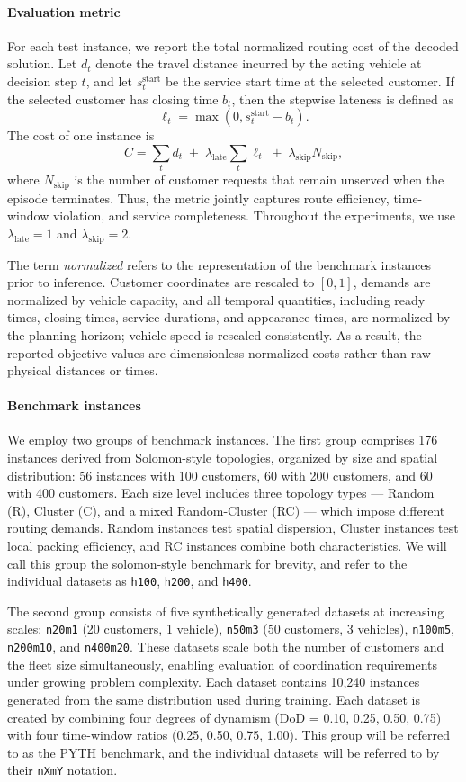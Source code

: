 \documentclass[conference]{IEEEtran}
\begin{document}
\paragraph{Evaluation metric}
For each test instance, we report the total normalized routing cost of the decoded solution. Let $d_t$ denote the travel distance incurred by the acting vehicle at decision step $t$, and let $s_t^{\mathrm{start}}$ be the service start time at the selected customer. If the selected customer has closing time $b_t$, then the stepwise lateness is defined as
\[
\ell_t = \max(0, s_t^{\mathrm{start}} - b_t).
\]
The cost of one instance is
\[
C
=
\sum_t d_t
\;+\;
\lambda_{\mathrm{late}} \sum_t \ell_t
\;+\;
\lambda_{\mathrm{skip}} N_{\mathrm{skip}},
\]
where $N_{\mathrm{skip}}$ is the number of customer requests that remain unserved when the episode terminates. Thus, the metric jointly captures route efficiency, time-window violation, and service completeness. Throughout the experiments, we use $\lambda_{\mathrm{late}} = 1$ and $\lambda_{\mathrm{skip}} = 2$.

The term \emph{normalized} refers to the representation of the benchmark instances prior to inference. Customer coordinates are rescaled to $[0,1]$, demands are normalized by vehicle capacity, and all temporal quantities, including ready times, closing times, service durations, and appearance times, are normalized by the planning horizon; vehicle speed is rescaled consistently. As a result, the reported objective values are dimensionless normalized costs rather than raw physical distances or times.

\paragraph{Benchmark instances}
We employ two groups of benchmark instances. The first group comprises 176 instances derived from Solomon-style topologies, organized by size and spatial distribution: 56 instances with 100 customers, 60 with 200 customers, and 60 with 400 customers. Each size level includes three topology types --- Random (R), Cluster (C), and a mixed Random-Cluster (RC) --- which impose different routing demands. Random instances test spatial dispersion, Cluster instances test local packing efficiency, and RC instances combine both characteristics. We will call this group the solomon-style benchmark for brevity, and refer to the individual datasets as \texttt{h100}, \texttt{h200}, and \texttt{h400}.

The second group consists of five synthetically generated datasets at increasing scales: \texttt{n20m1} (20 customers, 1 vehicle), \texttt{n50m3} (50 customers, 3 vehicles), \texttt{n100m5}, \texttt{n200m10}, and \texttt{n400m20}. These datasets scale both the number of customers and the fleet size simultaneously, enabling evaluation of coordination requirements under growing problem complexity. Each dataset contains 10,240 instances generated from the same distribution used during training. Each dataset is created by combining four degrees of dynamism (DoD = 0.10, 0.25, 0.50, 0.75) with four time-window ratios (0.25, 0.50, 0.75, 1.00). This group will be referred to as the PYTH benchmark, and the individual datasets will be referred to by their \texttt{nXmY} notation.
\end{document}
